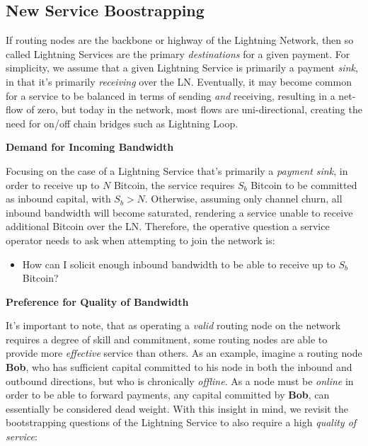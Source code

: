 \documentclass[10pt,a4paper]{article}
\theoremstyle{definition}
\begin{document}
\subsection{New Service Boostrapping}

If routing nodes are the backbone or highway of the Lightning Network, then so
called Lightning Services are the primary \emph{destinations} for a given
payment. For simplicity, we assume that a given Lightning Service is primarily
a payment \emph{sink}, in that it's primarily \emph{receiving} over the LN. Eventually,
it may become common for a service to be balanced in terms of sending
\emph{and} receiving, resulting in a net-flow of zero, but today in the
network, most flows are uni-directional, creating the need for on/off
chain bridges such as Lightning Loop.

\begin{center}
	\textbf{Demand for Incoming Bandwidth}
\end{center}

Focusing on the case of a Lightning Service that's primarily a \emph{payment
sink}, in order to receive up to $N$ Bitcoin, the service requires $S_b$
Bitcoin to be committed as inbound capital, with $S_b > N$. Otherwise, assuming
only channel churn, all inbound bandwidth will become saturated, rendering a
service unable to receive additional Bitcoin over the LN. Therefore, the
operative question a service operator needs to ask when attempting to join the
network is:

\begin{itemize}
        \item How can I solicit enough inbound bandwidth to be able to receive
            up to $S_b$ Bitcoin?
\end{itemize}


\begin{center}
	\textbf{Preference for Quality of Bandwidth}
\end{center}

It's important to note, that as operating a \emph{valid} routing node on the
network requires a degree of skill and commitment, some routing nodes are able
to provide more \emph{effective} service than others.  As an example, imagine a
routing node \textbf{Bob}, who has sufficient capital committed to his node in
both the inbound and outbound directions, but who is chronically
\emph{offline}. As a node must be \emph{online} in order to be able to forward
payments, any capital committed by \textbf{Bob}, can essentially be considered
dead weight. With this insight in mind, we revisit the bootstrapping questions
of the Lightning Service to also require a high \emph{quality of service}:
\end{document}
